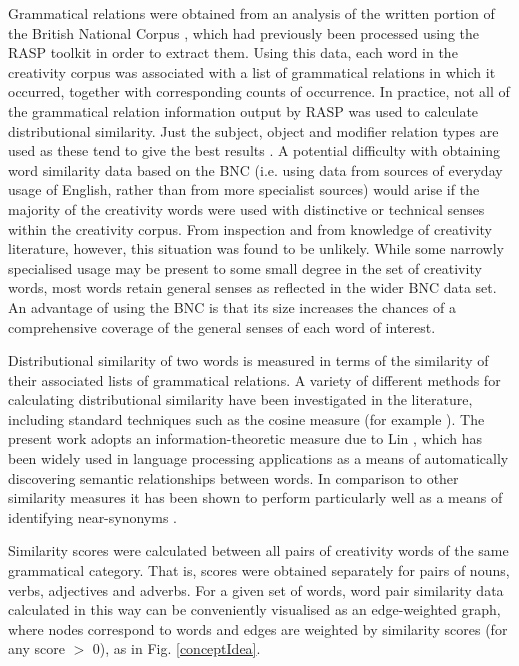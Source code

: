 \documentclass[10pt,letterpaper]{article}
\begin{document}
\noindent
Grammatical relations were obtained from an analysis of the written portion of the British National Corpus \cite{leech92}, which had previously been processed using the RASP toolkit \cite{briscoe06} in order to extract them. Using this data, each word in the creativity corpus was associated with a list of grammatical relations in which it occurred, together with corresponding counts of occurrence. In practice, not all of the grammatical relation information output by RASP was used to calculate distributional similarity. Just the subject, object and modifier relation types are used as these tend to give the best results \cite{weeds03}. A potential difficulty with obtaining word similarity data based on the BNC (i.e. using data from sources of everyday usage of English, rather than from more specialist sources) would arise if the majority of the creativity words were used with distinctive or technical senses within the creativity corpus. From inspection and from knowledge of creativity literature, however, this situation was found to be unlikely. While some narrowly specialised usage may be present to some small degree in the set of creativity words, most words retain general senses as reflected in the wider BNC data set. An advantage of using the BNC is that its  size increases the chances of a comprehensive coverage of the general senses of each word of interest.

Distributional similarity of two words is measured in terms of the similarity of their associated lists of grammatical relations. A variety of different methods for calculating distributional similarity have been investigated in the literature, including standard techniques such as the cosine measure (for example \cite{mannschu99}). The present work adopts an information-theoretic measure due to Lin \cite{lin98}, which has been widely used in language processing applications as a means of automatically discovering semantic relationships between words. In comparison to other similarity measures it has been shown to perform particularly well as a means of identifying near-synonyms \cite{weedsweir03,mccanavi09}.

Similarity scores were calculated between all pairs of creativity words of the same grammatical category. That is, scores were obtained separately for pairs of nouns, verbs, adjectives and adverbs. For a given set of words, word pair similarity data calculated in this way can be conveniently visualised as an edge-weighted graph, where nodes  correspond to words and edges are weighted by similarity scores (for any score $>$ 0), as in Fig. \ref{conceptIdea}.
\end{document}
